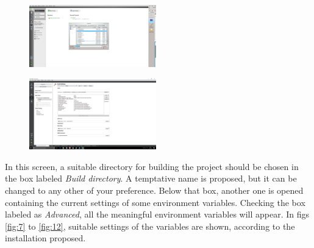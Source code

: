 \documentclass[a4paper,10pt]{article}
\begin{document}
\begin{minipage}{0.5\linewidth}
\begin{figure}[H]
\begin{center}
\includegraphics[width=5.5cm]{fig5.png}
\vspace*{-1mm}
\caption{\small  \label{fig:5}}
\end{center}
\end{figure}
\end{minipage}
\begin{minipage}{0.5\linewidth}
\begin{figure}[H]
\begin{center}
\includegraphics[width=5.5cm]{fig6.png}
\vspace*{-1mm}
\caption{\small  \label{fig:6}}
\end{center}
\end{figure}
\end{minipage}

In this screen, a suitable directory for building the project should be chosen in the box labeled
{\it Build directory}. A temptative name is proposed, but it can be changed to any other of your preference.
Below that box, another one is opened containing the current settings of some environment variables.
Checking the box labeled as {\it Advanced}, all the meaningful environment variables will appear.
In figs \ref{fig:7} to \ref{fig:12}, suitable settings of the variables are shown, according to the
installation proposed.
\end{document}
